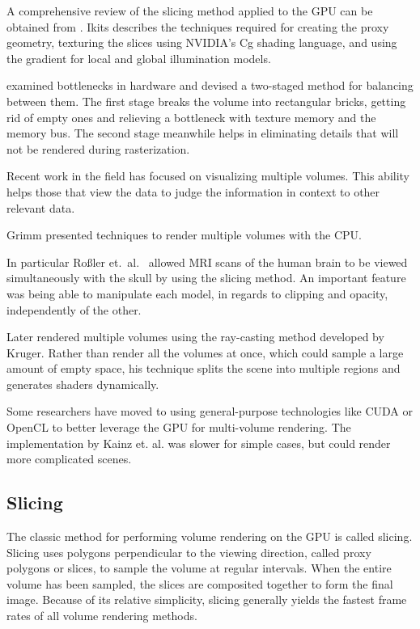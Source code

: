 \documentclass{article}
\begin{document}
A comprehensive review of the slicing method applied to the GPU can be obtained
from \cite{Ikits04}.  Ikits describes the techniques required for creating the
proxy geometry, texturing the slices using NVIDIA’s Cg shading language, and
using the gradient for local and global illumination models.

\cite{Ruijters06} examined bottlenecks in hardware and devised a two-staged
method for balancing between them.  The first stage breaks the volume into
rectangular bricks, getting rid of empty ones and relieving a bottleneck with
texture memory and the memory bus.  The second stage meanwhile helps in
eliminating details that will not be rendered during rasterization.

Recent work in the field has focused on visualizing multiple volumes.  This
ability helps those that view the data to judge the information in context to
other relevant data.

Grimm \cite{Grimm04} presented techniques to render multiple volumes with the
CPU.

In particular Roßler et.\ al.\ \cite{Rossler06} allowed MRI scans of the human
brain to be viewed simultaneously with the skull by using the slicing method.
An important feature was being able to manipulate each model, in regards to
clipping and opacity, independently of the other.

Later \cite{Rossler08} rendered multiple volumes using the ray-casting method
developed by Kruger.  Rather than render all the volumes at once, which could
sample a large amount of empty space, his technique splits the scene into
multiple regions and generates shaders dynamically.

Some researchers have moved to using general-purpose technologies like CUDA or
OpenCL to better leverage the GPU for multi-volume rendering.  The
implementation by Kainz et. al. \cite{Kainz09} was slower for simple cases, but could
render more complicated scenes.

\subsection{Slicing}

The classic method for performing volume rendering on the GPU is called slicing.
Slicing uses polygons perpendicular to the viewing direction, called proxy
polygons or slices, to sample the volume at regular intervals.  When the entire
volume has been sampled, the slices are composited together to form the final
image.  Because of its relative simplicity, slicing generally yields the fastest
frame rates of all volume rendering methods.
\end{document}
